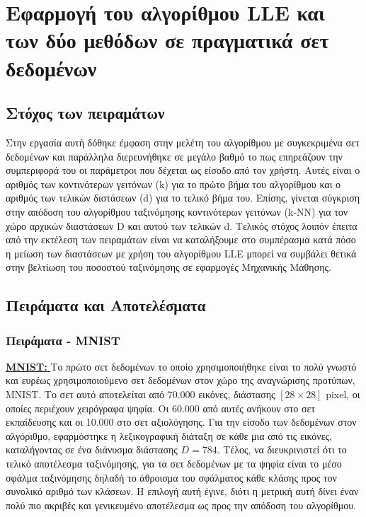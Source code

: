 \chapter{Εφαρμογή του αλγορίθμου \textlatin{LLE} και των δύο μεθόδων σε πραγματικά σετ δεδομένων}
\section{Στόχος των πειραμάτων}
\par
Στην εργασία αυτή δόθηκε έμφαση στην μελέτη του αλγορίθμου με συγκεκριμένα σετ δεδομένων και παράλληλα διερευνήθηκε σε μεγάλο βαθμό το πως επηρεάζουν την συμπεριφορά του οι παράμετροι που δέχεται ως είσοδο από τον χρήστη. Αυτές είναι ο αριθμός των κοντινότερων γειτόνων \textlatin{(k)} για το πρώτο βήμα του αλγορίθμου και ο αριθμός των τελικών διστάσεων \textlatin{(d)} για το τελικό βήμα του. Επίσης, γίνεται σύγκριση στην απόδοση του αλγορίθμου ταξινόμησης κοντινότερων γειτόνων \textlatin{(k-NN)} για τον χώρο αρχικών διαστάσεων \textlatin{D} και αυτού των τελικών \textlatin{d}. Τελικός στόχος λοιπόν έπειτα από την εκτέλεση των πειραμάτων είναι να καταλήξουμε στο συμπέρασμα κατά πόσο η μείωση των διαστάσεων με χρήση του αλγορίθμου \textlatin{LLE} μπορεί να συμβάλει θετικά στην βελτίωση του ποσοστού ταξινόμησης σε εφαρμογές Μηχανικής Μάθησης.

\section{Πειράματα και Αποτελέσματα}

\subsection{Πειράματα - \textlatin{MNIST}}
\par
\href{http://yann.lecun.com/exdb/mnist/}{\textbf{\textlatin{MNIST: }}}Το πρώτο σετ δεδομένων το οποίο χρησιμοποιήθηκε είναι το πολύ γνωστό και ευρέως χρησιμοποιούμενο σετ δεδομένων στον χώρο της αναγνώρισης προτύπων, \textlatin{MNIST}\textlatin{\cite{mnist}}. Το σετ αυτό αποτελείται από 70.000 εικόνες, διάστασης $[28 \times 28]$ \textlatin{pixel}, οι οποίες περιέχουν χειρόγραφα ψηφία. Οι 60.000 από αυτές ανήκουν στο σετ εκπαίδευσης και οι 10.000 στο σετ αξιολόγησης. Για την είσοδο των δεδομένων στον αλγόριθμο, εφαρμόστηκε η λεξικογραφική διάταξη σε κάθε μια από τις εικόνες, καταλήγοντας σε ένα διάνυσμα διάστασης $D = 784$. Τέλος, να διευκρινιστεί ότι το τελικό αποτέλεσμα ταξινόμησης, για τα σετ δεδομένων με τα ψηφία είναι το μέσο σφάλμα ταξινόμησης δηλαδή το άθροισμα του σφάλματος κάθε κλάσης προς τον συνολικό αριθμό των κλάσεων. Η επιλογή αυτή έγινε, διότι η μετρική αυτή δίνει έναν πολύ πιο ακριβές και γενικευμένο αποτέλεσμα ως προς την απόδοση του αλγορίθμου.

